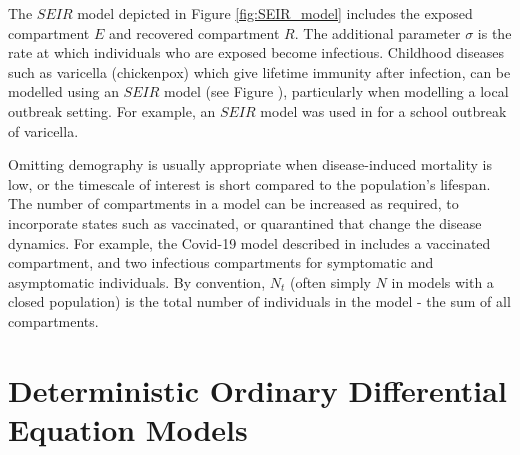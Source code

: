 The $SEIR$ model depicted in Figure \ref{fig:SEIR_model} includes the
exposed compartment $E$ and recovered compartment $R.$ The additional
parameter $\sigma$ is the rate at which individuals who are exposed become
infectious.
Childhood diseases such as varicella (chickenpox) which give lifetime immunity
after infection, can be modelled using an $SEIR$ model (see Figure
), particularly when modelling a local outbreak setting.
For example, an $SEIR$ model was used in \cite{zha_research_2020} for a school
outbreak of varicella.

Omitting demography is usually appropriate when
disease-induced mortality is low, or the timescale of interest is short
compared to the population's lifespan.
The number of compartments in a model can be increased
as required, to incorporate states such as
vaccinated, or quarantined that change the disease dynamics.
For example, the Covid-19 model described in \cite{acuna-zegarra_covid-19_2021}
includes a vaccinated compartment, and two infectious compartments for
symptomatic and asymptomatic individuals.
By convention, $N_t$ (often simply $N$ in models with a
closed population) is the total number of individuals in the model - the sum of
all compartments.

\section{Deterministic Ordinary Differential Equation Models}

